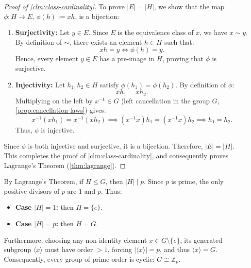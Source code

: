 \begin{content}
\begin{proof}[Proof of \cref{clm:class-cardinality}]
To prove $|E| = |H|$, we show that the map $\phi \colon H \to E$, $\phi(h) := xh$, is a bijection:
\begin{enumerate}
    \item \textbf{Surjectivity:}
    Let $y \in E$. Since $E$ is the equivalence class of $x$, we have $x \sim y$. By definition of $\sim$, there exists an element $h \in H$ such that:
    \[
    xh = y \iff \phi(h) = y.
    \]
    Hence, every element $y \in E$ has a pre-image in $H$, proving that $\phi$ is surjective.

    \item \textbf{Injectivity:}
    Let $h_1, h_2 \in H$ satisfy $\phi(h_1) = \phi(h_2)$. By definition of $\phi$:
    \[
    xh_1 = xh_2.
    \]
    Multiplying on the left by $x^{-1} \in G$ (left cancellation in the group $G$, \cref{prop:cancellation-laws}) gives:
    \[
    x^{-1}(xh_1) = x^{-1}(xh_2) \implies (x^{-1}x)h_1 = (x^{-1}x)h_2 \implies h_1 = h_2.
    \]
    Thus, $\phi$ is injective.
\end{enumerate}
Since $\phi$ is both injective and surjective, it is a bijection. Therefore, $|E| = |H|$. This completes the proof of \cref{clm:class-cardinality}, and consequently proves Lagrange's Theorem (\cref{thm:lagrange}).
\end{proof}


\begin{steps}
By Lagrange's Theorem, if $H \le G$, then $|H| \mid p$. Since $p$ is prime, the only positive divisors of $p$ are $1$ and $p$. Thus:
\begin{itemize}
    \item \textbf{Case $|H| = 1$:} then $H = \{e\}$.
    \item \textbf{Case $|H| = p$:} then $H = G$.
\end{itemize}
Furthermore, choosing any non-identity element $x \in G \setminus \{e\}$, its generated subgroup $\langle x \rangle$ must have order $> 1$, forcing $|\langle x \rangle| = p$, and thus $\langle x \rangle = G$. Consequently, every group of prime order is cyclic: $G \cong \mathbb{Z}_p$.
\end{steps}
\end{content}

